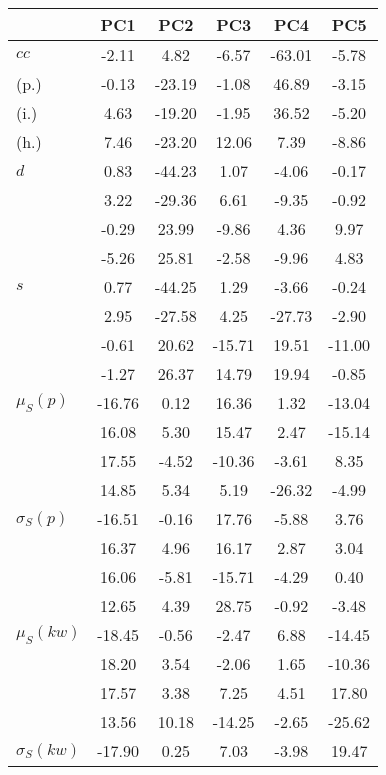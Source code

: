 \begin{table}[h!]
\begin{center}
\begin{tabular}{| l | c | c | c | c | c |}\hline
 & PC1 & PC2 & PC3 & PC4 & PC5 \\\hline
$cc$ & -2.11  & 4.82  & -6.57  & -63.01  & -5.78 \\\hline
(p.) & -0.13  & -23.19  & -1.08  & 46.89  & -3.15 \\\hline
(i.) & 4.63  & -19.20  & -1.95  & 36.52  & -5.20 \\\hline
(h.) & 7.46  & -23.20  & 12.06  & 7.39  & -8.86 \\\hline
$d$ & 0.83  & -44.23  & 1.07  & -4.06  & -0.17 \\\hline
 & 3.22  & -29.36  & 6.61  & -9.35  & -0.92 \\\hline
 & -0.29  & 23.99  & -9.86  & 4.36  & 9.97 \\\hline
 & -5.26  & 25.81  & -2.58  & -9.96  & 4.83 \\\hline
$s$ & 0.77  & -44.25  & 1.29  & -3.66  & -0.24 \\\hline
 & 2.95  & -27.58  & 4.25  & -27.73  & -2.90 \\\hline
 & -0.61  & 20.62  & -15.71  & 19.51  & -11.00 \\\hline
 & -1.27  & 26.37  & 14.79  & 19.94  & -0.85 \\\hline
$\mu_S(p)$ & -16.76  & 0.12  & 16.36  & 1.32  & -13.04 \\\hline
 & 16.08  & 5.30  & 15.47  & 2.47  & -15.14 \\\hline
 & 17.55  & -4.52  & -10.36  & -3.61  & 8.35 \\\hline
 & 14.85  & 5.34  & 5.19  & -26.32  & -4.99 \\\hline
$\sigma_S(p)$ & -16.51  & -0.16  & 17.76  & -5.88  & 3.76 \\\hline
 & 16.37  & 4.96  & 16.17  & 2.87  & 3.04 \\\hline
 & 16.06  & -5.81  & -15.71  & -4.29  & 0.40 \\\hline
 & 12.65  & 4.39  & 28.75  & -0.92  & -3.48 \\\hline
$\mu_S(kw)$ & -18.45  & -0.56  & -2.47  & 6.88  & -14.45 \\\hline
 & 18.20  & 3.54  & -2.06  & 1.65  & -10.36 \\\hline
 & 17.57  & 3.38  & 7.25  & 4.51  & 17.80 \\\hline
 & 13.56  & 10.18  & -14.25  & -2.65  & -25.62 \\\hline
$\sigma_S(kw)$ & -17.90  & 0.25  & 7.03  & -3.98  & 19.47 \\\hline

\end{tabular}
\end{center}
\end{table}
